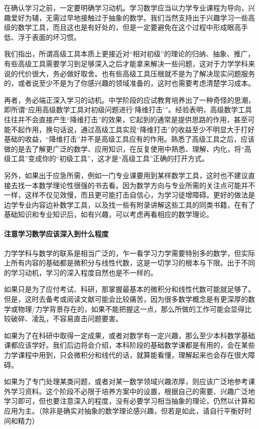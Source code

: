 在确认学习之前，一定要明确学习动机。学习数学应当以力学专业课程为导向，兴趣爱好为辅，无需过早地接触过于抽象的数学。我们当然支持出于兴趣学习一些高级的数学工具，而且这也是有好处的，但是一定要避免在这个过程中形成眼高手低、浮于表面的坏习惯。

我们指出，所谓高级工具本质上更接近对“相对初级”的理论的归纳、抽象、推广，有些高级工具需要学习到足够深入之后才能拿来解决一些问题，这对于力学学科来说的代价很大，务必做好取舍。也有些高级工具压根就不是为了解决现实问题服务的，或者说至少不是为了你感兴趣的领域准备的，这时也需要考虑清楚学习成本。

再者，务必端正深入学习的动机。中学阶段的应试教育培养出了一种奇怪的思潮，即所谓“应用高级数学工具对初级问题进行‘降维打击’”。经验表明，高级数学工具往往并不会直接产生“降维打击”的效果，它起到的通常是提供思路的作用，甚至可能不起作用，换句话说，通过高级工具实现“降维打击”的收益至少不明显大于打好基础的收益，“降维打击”并不是高级工具应有的作用。熟悉了高级工具之后，应该做的是去了解更广泛的数学、应用知识，在反复使用中熟悉、理解、内化，将“高级工具”变成你的“初级工具”，这才是“高级工具”正确的打开方式。

另外，如果出于应急所需，例如一门专业课要用到某样数学工具，这时也不建议直接去找一本数学理论性很强的书去看。因为数学方向与专业所需的关注点可能并不一样，这样不仅见效慢，而且更可能打击自信心，为学习徒增障碍。更好的做法是边学专业内容边补数学工具，以及找一些有附录讲解这些工具的同类书籍，在有了基础知识和专业知识后，如有兴趣，可以考虑再看相应的数学理论。

\paragraph{注意学习数学应该深入到什么程度}

力学学科与数学的联系是相当广泛的，乍一看学习力学需要特别多的数学，但实际上所有内容的基础都是微积分与线性代数，这是一切学习的根本与下限。出于不同的学习动机，学习的深入程度自然也是不一样的。

如果只是为了应付考试、科研，那掌握最基本的微积分和线性代数可能就足够了。但是，这时去备考或阅读文献可能会比较痛苦，因为很多数学概念是有更深厚的数学或物理/力学背景存在的，如果不能把握这一点，那么所做的工作可能会显得比较破碎、凌乱，不容易直击问题要害。

如果为了在科研中取得一定成果，或者对数学有一定兴趣，那么至少本科数学基础课都应该学好。我们后边将会介绍，本科阶段的基础数学课都是有用的，会在某些力学课程中用到，只会微积分和线代的话，就算能看懂，理解起来也会存在很大障碍。

如果为了专门处理某类问题，或者对某一数学领域兴趣浓厚，则应该广泛地参考课外学习资料。这个阶段不必限于培养方案中的设置，根据自己的需要、兴趣广泛地学习即可，但也要注意深入的程度，没有必要学习相当抽象的理论，仍然以计算和应用为主。（除非是确实对抽象的数学理论感兴趣，但若是如此，请自行平衡好时间和精力）

